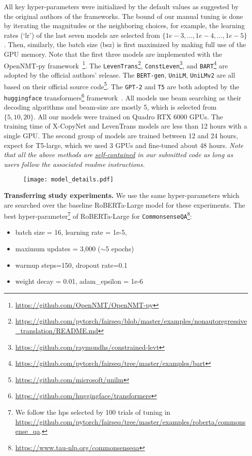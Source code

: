 \documentclass[11pt,a4paper]{article}
\begin{document}
All key hyper-parameters were initialized by the default values as suggested by the original authors of the frameworks.
The bound of our manual tuning is done by iterating the magnitudes or the neighboring choices, for example, the learning rates (`lr') of the last seven models  are selected from $\{1e-3,\dots,1e-4, \dots, 1e-5\}$.
Then, similarly, the batch size (bsz) is first maximized by making full use of the GPU memory.
Note that the first three models are implemented with the OpenNMT-py framework~\footnote{\url{https://github.com/OpenNMT/OpenNMT-py}}.
The \texttt{LevenTrans}\footnote{\url{https://github.com/pytorch/fairseq/blob/master/examples/nonautoregressive_translation/README.md}}, \texttt{ConstLeven}\footnote{\url{https://github.com/raymondhs/constrained-levt}}, and \texttt{BART}\footnote{\url{https://github.com/pytorch/fairseq/tree/master/examples/bart}} are adopted by the official authors' release.
The \texttt{BERT-gen}, \texttt{UniLM}, \texttt{UniLMv2} are all based on their official source code\footnote{\url{https://github.com/microsoft/unilm}}.
The \texttt{GPT-2} and \texttt{T5} are both adopted by the \texttt{huggingface} transformers\footnote{\url{https://github.com/huggingface/transformers}} framework~\cite{Wolf2019HuggingFacesTS}.
All models use beam searching as their decoding algorithms and beam-size are mostly 5, which is selected from $\{5,10,20\}$.
All our models were trained on Quadro RTX 6000 GPUs.
The training time of X-CopyNet and LevenTrans models are less than 12 hours with a single GPU.
The second group of models are trained between 12 and 24 hours, expect for T5-large, which we used 3 GPUs and fine-tuned about 48 hours.
\textit{Note that all the above methods are \underline{self-contained} in our submitted code as long as users follow the associated readme instructions.}
\begin{figure}[t!]
	\centering
	\texttt{[image: model\_details.pdf]}
\label{tab:model_details}
\end{figure}

\textbf{Transferring study experiments.}\quad 
 We use the same hyper-parameters which are searched over the baseline RoBERTa-Large model for these experiments. 
 The best hyper-parameter\footnote{We follow the hps selected by 100 trials of tuning in \url{https://github.com/pytorch/fairseq/tree/master/examples/roberta/commonsense_qa}.} of RoBERTa-Large for \texttt{CommonsenseQA}\footnote{\url{https://www.tau-nlp.org/commonsenseqa}}: 
 \begin{itemize}
     \item batch size = 16, learning rate = 1e-5,
     \item maximum updates = 3,000 ($\sim$5 epochs) \item warmup steps=150, dropout rate=0.1
     \item weight decay = 0.01, adam\_epsilon = 1e-6
 \end{itemize}
 
\end{document}
